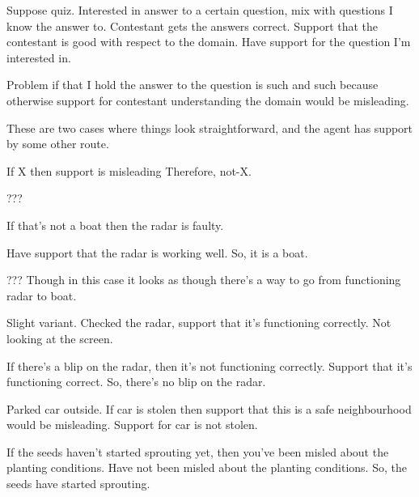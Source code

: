 \documentclass[10pt]{article}
\begin{document}
Suppose quiz.
Interested in answer to a certain question, mix with questions I know the answer to.
Contestant gets the answers correct.
Support that the contestant is good with respect to the domain.
Have support for the question I'm interested in.

Problem if that I hold the answer to the question is such and such because otherwise support for contestant understanding the domain would be misleading.

These are two cases where things look straightforward, and the agent has support by some other route.

If X then support is misleading
Therefore, not-X.

???

If that's not a boat then the radar is faulty.

Have support that the radar is working well.
So, it is a boat.

??? Though in this case it looks as though there's a way to go from functioning radar to boat.

Slight variant.
Checked the radar, support that it's functioning correctly.
Not looking at the screen.

If there's a blip on the radar, then it's not functioning correctly.
Support that it's functioning correct.
So, there's no blip on the radar.



Parked car outside.
If car is stolen then support that this is a safe neighbourhood would be misleading.
Support for car is not stolen.


If the seeds haven't started sprouting yet, then you've been misled about the planting conditions.
Have not been misled about the planting conditions.
So, the seeds have started sprouting.
\end{document}
